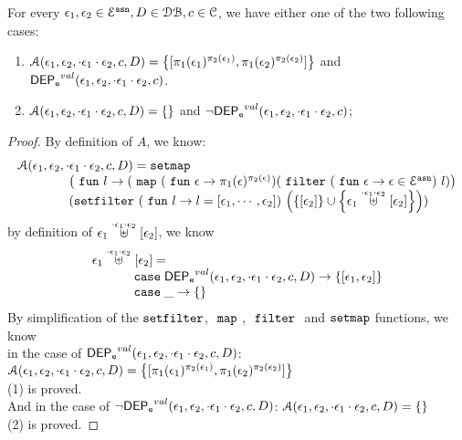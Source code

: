 %
\begin{lem}
\label{lem:inv_alg2}
For every $\mathtt{\epsilon}_1, \mathtt{\epsilon}_2 \in \mathcal{E}^{\mathtt{{asn}}}, D \in \mathcal{DB} , c \in \mathcal{C}$, we have either one of the two following cases:
\begin{enumerate}
  \item $\mathcal{A}(\event_1, \event_2, \cdot \event_1 \cdot \event_2, c, D) = 
  \left\{[\pi_1(\event_1)^{\pi_2(\event_1)}, \pi_1(\event_2)^{\pi_2(\event_2)}] \right \}$ 
  and $\mathsf{DEP_{\mathtt{e}}}^{val}(\mathtt{\epsilon}_1, \mathtt{\epsilon}_2, \cdot \mathtt{\epsilon}_1 \cdot \mathtt{\epsilon}_2, c)$.
  \item  $\mathcal{A}(\mathtt{\epsilon}_1, \mathtt{\epsilon}_2, \cdot \mathtt{\epsilon}_1 \cdot \mathtt{\epsilon}_2, c, D) = \{\}$ 
  and $\neg \mathsf{DEP_{\mathtt{e}}}^{val}(\mathtt{\epsilon}_1, \mathtt{\epsilon}_2, \cdot \mathtt{\epsilon}_1 \cdot \mathtt{\epsilon}_2, c)$;
\end{enumerate}
\end{lem}
\begin{proof}
By definition of $A$, we know:
%
\[
	\begin{array}{l}
	\mathcal{A}(\event_1, \event_2, \cdot \event_1 \cdot \event_2, c, D)
	= 
	\kw{setmap} ~
	\\ \qquad \qquad
	\left(\efun l \to ( \emap 
		(\efun  \event \to \pi_1(\event)^{\pi_2(\event)})
	(\efilter 
		(\efun \event \to  \event \in \eventset^{\asn}) ~ l) \right)
	\\ \qquad \qquad
	(\kw{setfilter} ~
		(\efun l \to l = [\event_1, \cdots, \event_2]) ~ 
		\left(\left\{[\event_2]\right\} \cup \left\{ \event_1 \stackrel{\cdot \event_1 \cdot \event_2}{\uplus} [\event_2] \right\} \right))
	\end{array}
\]
by definition of $ \mathtt{\epsilon}_1 \stackrel{\cdot \mathtt{\epsilon}_1 \cdot \mathtt{\epsilon}_2}{\uplus} [\mathtt{\epsilon}_2] $, we know 
\[
	\begin{array}{l}
	\event_1 \stackrel{\cdot \event_1 \cdot \event_2}{\uplus} [\event_2]
	=   
	\\ \quad \qquad 	
	\ecase \eventdep^{val}(\event_1, \event_2, \cdot \event_1 \cdot \event_2, c, D)
	\to \left\{ [\event_1, \event_2] \right\}
	\\ \quad \qquad 	
	\ecase \_
	\to \left\{ \right\}
\end{array}
\]
%
By simplification of the $\mathtt{setfilter}$, $~\mathtt{map}~$, $~\mathtt{filter}~$ and $\mathtt{setmap}$ functions, we know
\\
in the case of $\mathsf{DEP_{\mathtt{e}}}^{val}(\mathtt{\epsilon}_1, \mathtt{\epsilon}_2, \cdot \mathtt{\epsilon}_1 \cdot \mathtt{\epsilon}_2, c, D)$:
$\mathcal{A}(\event_1, \event_2, \cdot \event_1 \cdot \event_2, c, D) = 
  \left\{[\pi_1(\event_1)^{\pi_2(\event_1)}, \pi_1(\event_2)^{\pi_2(\event_2)}] \right \}$
\\
(1) is proved.
\\
And in the case of $\neg \mathsf{DEP_{\mathtt{e}}}^{val}(\mathtt{\epsilon}_1, \mathtt{\epsilon}_2, \cdot \mathtt{\epsilon}_1 \cdot \mathtt{\epsilon}_2, c, D)$: 
$\mathcal{A}(\event_1, \event_2, \cdot  \event_1 \cdot \event_2, c, D) = 
  \left\{ \right \}$
\\
(2) is proved.
\end{proof}
%
%
%
